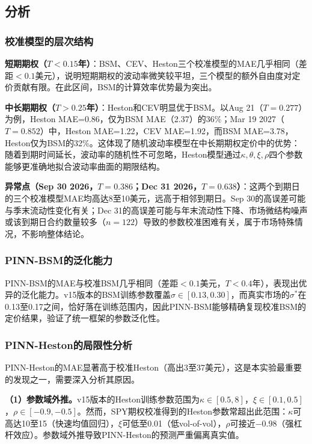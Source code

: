 \subsection{分析}

\subsubsection{校准模型的层次结构}

\textbf{短期期权（$T<0.15$年）}：BSM、CEV、Heston三个校准模型的MAE几乎相同（差距$<0.1$美元），说明短期期权的波动率微笑较平坦，三个模型的额外自由度对定价贡献有限。在此区间，BSM的计算效率优势最为突出。

\textbf{中长期期权（$T>0.25$年）}：Heston和CEV明显优于BSM。以Aug 21（$T=0.277$）为例，Heston MAE=0.86，仅为BSM MAE（2.37）的36\%；Mar 19 2027（$T=0.852$）中，Heston MAE=1.22，CEV MAE=1.92，而BSM MAE=3.78，Heston仅为BSM的32\%。这体现了随机波动率模型在中长期期权定价中的优势：随着到期时间延长，波动率的随机性不可忽略，Heston模型通过$\kappa,\theta,\xi,\rho$四个参数能够更准确地拟合波动率曲面的期限结构。

\textbf{异常点（Sep 30 2026，$T=0.386$；Dec 31 2026，$T=0.638$）}：这两个到期日的三个校准模型MAE均高达8至10美元，远高于相邻到期日。Sep 30的高误差可能与季末流动性变化有关；Dec 31的高误差可能与年末流动性下降、市场微结构噪声或该到期日合约数量较多（$n=122$）导致的参数校准困难有关，属于市场特殊情况，不影响整体结论。

\subsubsection{PINN-BSM的泛化能力}

PINN-BSM的MAE与校准BSM几乎相同（差距$<0.1$美元，$T<0.4$年），表现出优异的泛化能力。v15版本的BSM训练参数覆盖$\sigma\in[0.13,0.30]$，而真实市场的$\sigma^*$在0.13至0.17之间，恰好落在训练范围内，因此PINN-BSM能够精确复现校准BSM的定价结果，验证了统一框架的参数泛化性。

\subsubsection{PINN-Heston的局限性分析}

PINN-Heston的MAE显著高于校准Heston（高出3至37美元），这是本实验最重要的发现之一，需要深入分析其原因。

\textbf{（1）参数域外推。}v15版本的Heston训练参数范围为$\kappa\in[0.5,8]$，$\xi\in[0.1,0.5]$，$\rho\in[-0.9,-0.5]$。然而，SPY期权校准得到的Heston参数常超出此范围：$\kappa$可高达10至15（快速均值回归），$\xi$可低至0.01（低vol-of-vol），$\rho$可接近$-0.98$（强杠杆效应）。参数域外推导致PINN-Heston的预测严重偏离真实值。

